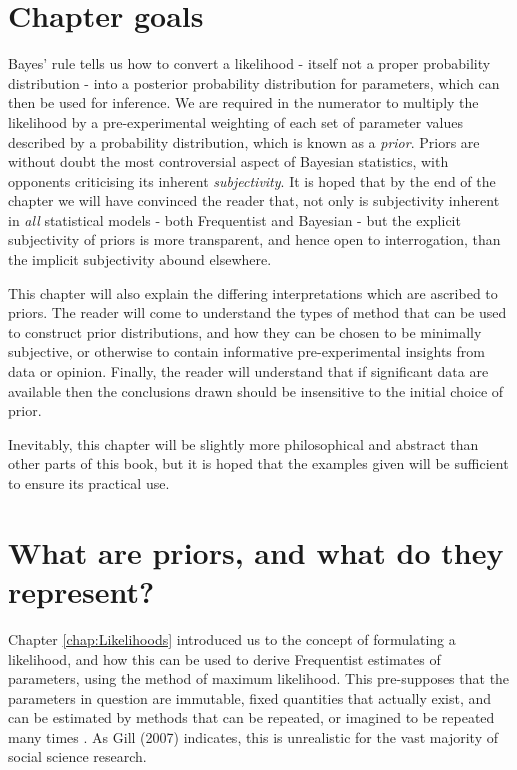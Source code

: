 \documentclass[11pt,fullpage]{book}
\begin{document}
\section{Chapter goals}
Bayes' rule tells us how to convert a likelihood - itself not a proper probability distribution - into a posterior probability distribution for parameters, which can then be used for inference. We are required in the numerator to multiply the likelihood by a pre-experimental weighting of each set of parameter values described by a probability distribution, which is known as a \textit{prior}. Priors are without doubt the most controversial aspect of Bayesian statistics, with opponents criticising its inherent \textit{subjectivity}. It is hoped that by the end of the chapter we will have convinced the reader that, not only is subjectivity inherent in \textit{all} statistical models - both Frequentist and Bayesian - but the explicit subjectivity of priors is more transparent, and hence open to interrogation, than the implicit subjectivity abound elsewhere.

This chapter will also explain the differing interpretations which are ascribed to priors. The reader will come to understand the types of method that can be used to construct prior distributions, and how they can be chosen to be minimally subjective, or otherwise to contain informative pre-experimental insights from data or opinion. Finally, the reader will understand that if significant data are available then the conclusions drawn should be insensitive to the initial choice of prior.

Inevitably, this chapter will be slightly more philosophical and abstract than other parts of this book, but it is hoped that the examples given will be sufficient to ensure its practical use.

\section{What are priors, and what do they represent?}
Chapter \ref{chap:Likelihoods} introduced us to the concept of formulating a likelihood, and how this can be used to derive Frequentist estimates of parameters, using the method of maximum likelihood. This pre-supposes that the parameters in question are immutable, fixed quantities that actually exist, and can be estimated by methods that can be repeated, or imagined to be repeated many times \cite{gill2007bayesian}. As Gill (2007) indicates, this is unrealistic for the vast majority of social science research.
\end{document}
